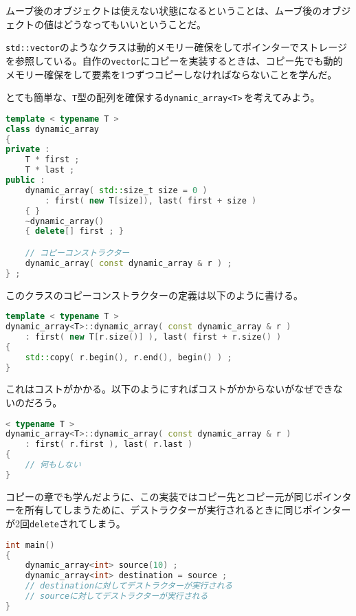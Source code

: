 ムーブ後のオブジェクトは使えない状態になるということは、ムーブ後のオブジェクトの値はどうなってもいいということだ。

\texttt{std::vector}のようなクラスは動的メモリー確保をしてポインターでストレージを参照している。自作の\texttt{vector}にコピーを実装するときは、コピー先でも動的メモリー確保をして要素を1つずつコピーしなければならないことを学んだ。

とても簡単な、\texttt{T}型の配列を確保する\texttt{dynamic\_array<T>}\,を考えてみよう。

\begin{lstlisting}[language={C++}]
template < typename T >
class dynamic_array
{
private :
    T * first ;
    T * last ;
public :
    dynamic_array( std::size_t size = 0 )
        : first( new T[size]), last( first + size )
    { }
    ~dynamic_array()
    { delete[] first ; }

    // コピーコンストラクター
    dynamic_array( const dynamic_array & r ) ;
} ;
\end{lstlisting}

このクラスのコピーコンストラクターの定義は以下のように書ける。

\begin{lstlisting}[language={C++}]
template < typename T >
dynamic_array<T>::dynamic_array( const dynamic_array & r )
    : first( new T[r.size()] ), last( first + r.size() ) 
{
    std::copy( r.begin(), r.end(), begin() ) ;
}
\end{lstlisting}

これはコストがかかる。以下のようにすればコストがかからないがなぜできないのだろう。

\ifTombow\pagebreak\fi
\begin{lstlisting}[language={C++}]
 < typename T >
dynamic_array<T>::dynamic_array( const dynamic_array & r )
    : first( r.first ), last( r.last ) 
{
    // 何もしない
}
\end{lstlisting}

コピーの章でも学んだように、この実装ではコピー先とコピー元が同じポインターを所有してしまうために、デストラクターが実行されるときに同じポインターが2回\texttt{delete}されてしまう。

\begin{lstlisting}[language={C++}]
int main()
{
    dynamic_array<int> source(10) ;
    dynamic_array<int> destination = source ;
    // destinationに対してデストラクターが実行される
    // sourceに対してデストラクターが実行される
}
\end{lstlisting}

